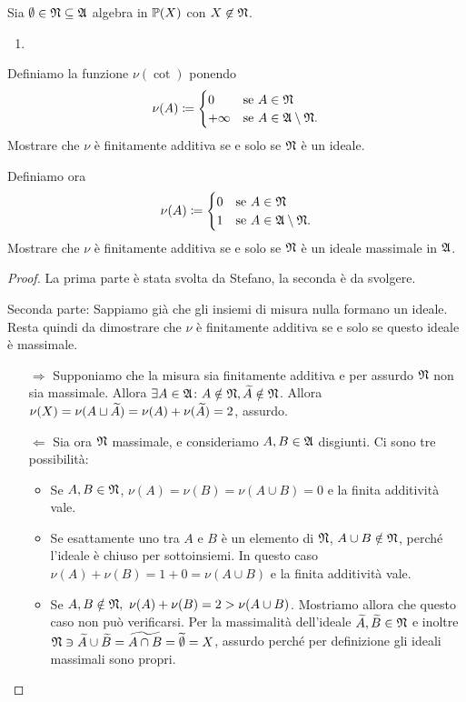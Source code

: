 \documentclass[../EserciziIstituzioniAnalisi.tex]{subfiles}
\begin{document}
\begin{exercise}[13/10/2016]
  Sia $\emptyset \in \mathfrak N \subseteq \mathfrak A$ algebra in $\mathbb P(X)$ con $X \not\in \mathfrak N$.
  \begin{enumerate}
  \item 
  \end{enumerate}
  Definiamo la funzione $\nu(\cot)$ ponendo 
  \begin{equation*}
    \nu(A) \coloneqq
    \begin{cases}
      0 & \text{se $A \in \mathfrak N$}\\
      +\infty & \text{se $A \in \mathfrak A\setminus \mathfrak N$}.
    \end{cases}
  \end{equation*}
  Mostrare che $\nu$ è finitamente additiva se e solo se $\mathfrak N$ è un ideale. 
\item Definiamo ora
  \begin{equation*}
    \nu(A) \coloneqq
    \begin{cases}
      0 & \text{se $A \in \mathfrak N$}\\
      1 & \text{se $A \in \mathfrak A\setminus \mathfrak N$}.
    \end{cases}
  \end{equation*}
  Mostrare che $\nu$ è finitamente additiva se e solo se $\mathfrak N$ è un ideale massimale in $\mathfrak A$.
\end{exercise}
\begin{proof}
  La prima parte è stata svolta da Stefano, la seconda è da svolgere.


  Seconda parte:
  Sappiamo già che gli insiemi di misura nulla formano un ideale. Resta quindi da dimostrare che $\nu$ è finitamente additiva se e solo se questo ideale è massimale.
  \begin{itemize}
    \item[$\Rightarrow$] Supponiamo che la misura sia finitamente additiva e per assurdo $\mathfrak N$ non sia massimale. Allora $\exists A\in\mathfrak A \colon A\notin \mathfrak N, \widetilde{A}\notin\mathfrak N$. Allora $\nu(X)=\nu(A\sqcup \widetilde{A})=\nu(A)+\nu (\widetilde{A})=2$, assurdo.
    \
    \item[$\Leftarrow$] Sia ora $\mathfrak N$ massimale, e consideriamo $A,B\in\mathfrak A$ disgiunti. Ci sono tre possibilità:
    \begin{itemize}
      \item Se $A,B\in\mathfrak N$, $\nu(A)=\nu(B)=\nu(A \cup B)=0$ e la finita additività vale.
      \item Se esattamente uno tra $A$ e $B$ è un elemento di $\mathfrak N$, $A\cup B \notin \mathfrak N$, perché l'ideale è chiuso per sottoinsiemi. In questo caso $\nu(A)+\nu(B)=1+0=\nu(A \cup B)$ e la finita additività vale.
      \item Se $A,B\notin\gN,\ \nu(A)+\nu(B)=2>\nu(A \cup B)$. Mostriamo allora che questo caso non può verificarsi. Per la massimalità dell'ideale $\widetilde{A},\widetilde{B}\in\mathfrak N$ e  inoltre $\mathfrak N \ni \widetilde{A} \cup \widetilde{B}=\widetilde{A\cap B}=\widetilde{\emptyset}=X$, assurdo perché per definizione gli ideali massimali sono propri.
    \end{itemize}
  \end{itemize}
\end{proof}
\end{document}
